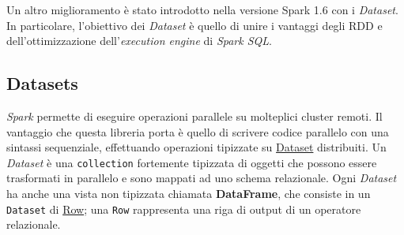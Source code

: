 Un altro miglioramento è stato introdotto nella versione Spark 1.6 con i \textit{Dataset}.
In particolare, l'obiettivo dei \textit{Dataset} è quello di unire i vantaggi degli RDD e dell'ottimizzazione dell'\textit{execution engine} di \textit{Spark SQL}.

\subsection{Datasets}\label{subsec:datasets}

\textit{Spark} permette di eseguire operazioni parallele su molteplici cluster remoti.
Il vantaggio che questa libreria porta è quello di scrivere codice parallelo con una sintassi sequenziale, effettuando operazioni tipizzate su \href{https://spark.apache.org/docs/latest/api/scala/org/apache/spark/sql/Dataset.html}{Dataset} distribuiti.
Un \textit{Dataset} è una \texttt{collection} fortemente tipizzata di oggetti che possono essere trasformati in parallelo e sono mappati ad uno schema relazionale.
Ogni \textit{Dataset} ha anche una vista non tipizzata chiamata \textbf{DataFrame}, che consiste in un \texttt{Dataset} di \href{https://spark.apache.org/docs/latest/api/scala/org/apache/spark/sql/Row.html}{Row};
una \texttt{Row} rappresenta una riga di output di un operatore relazionale.

